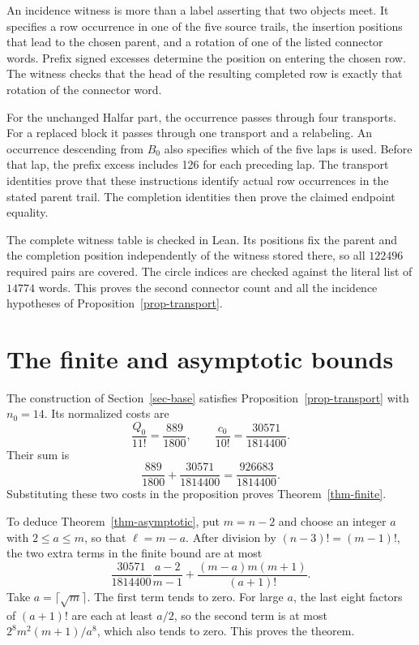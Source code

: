 \documentclass[11pt]{article}
\newcommand{\lam}{\frac{926683}{1814400}}
\newcommand{\gam}{\frac{30571}{1814400}}
\begin{document}
An incidence witness is more than a label asserting that two objects
meet. It specifies a row occurrence in one of the five source trails,
the insertion positions that lead to the chosen parent, and a rotation
of one of the listed connector words. Prefix signed excesses determine
the position on entering the chosen row. The witness checks that the
head of the resulting completed row is exactly that rotation of the
connector word.

For the unchanged Halfar part, the occurrence passes through four
transports. For a replaced block it passes through one transport and
a relabeling. An occurrence descending from $B_0$ also specifies which
of the five laps is used. Before that lap, the prefix excess includes
126 for each preceding lap. The transport identities prove that these
instructions identify actual row occurrences in the stated parent trail.
The completion identities then prove the claimed endpoint equality.

The complete witness table is checked in Lean. Its positions fix the
parent and the completion position independently of the witness stored
there, so all $\num{122496}$ required pairs are covered. The circle
indices are checked against the literal list of $\num{14774}$ words.
This proves the second connector count and all the incidence hypotheses
of Proposition~\ref{prop-transport}.

\section{The finite and asymptotic bounds}\label{sec-proof}

The construction of Section~\ref{sec-base} satisfies
Proposition~\ref{prop-transport} with $n_0=14$. Its normalized costs are
\[
 \frac{Q_0}{11!}=\frac{889}{1800},\qquad
 \frac{c_0}{10!}=\gam.
\]
Their sum is
\[
 \frac{889}{1800}+\gam=\lam.
\]
Substituting these two costs in the proposition proves
Theorem~\ref{thm-finite}.

To deduce Theorem~\ref{thm-asymptotic}, put $m=n-2$ and choose an integer
$a$ with $2\le a\le m$, so that $\ell=m-a$. After division by
$(n-3)!=(m-1)!$, the two extra terms in the finite bound are at most
\begin{equation}\label{eq-error}
 \gam\frac{a-2}{m-1}
       +\frac{(m-a)m(m+1)}{(a+1)!}.
\end{equation}
Take $a=\lceil\sqrt m\rceil$. The first term tends to zero. For large
$a$, the last eight factors of $(a+1)!$ are each at least $a/2$, so the
second term is at most $2^8m^2(m+1)/a^8$, which also tends to zero.
This proves the theorem.
\end{document}
